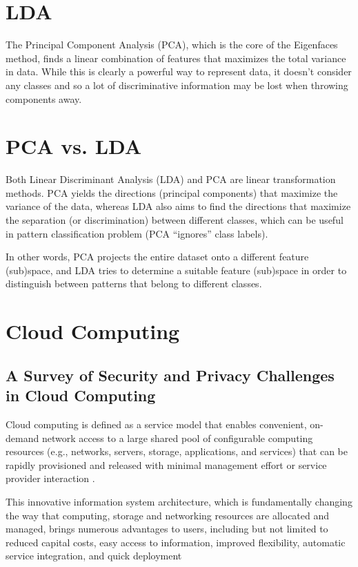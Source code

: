 \documentclass[a4paper]{article}
\begin{document}
\section{LDA}
The Principal Component Analysis (PCA), which is the core of the Eigenfaces method, finds a linear combination of features that maximizes the total variance in data. While this is clearly a powerful way to represent data, it doesn’t consider any classes and so a lot of discriminative information may be lost when throwing components away.

\section{PCA vs. LDA}
Both Linear Discriminant Analysis (LDA) and PCA are linear transformation methods. PCA yields the directions (principal components) that maximize the variance of the data, whereas LDA also aims to find the directions that maximize the separation (or discrimination) between different classes, which can be useful in pattern classification problem (PCA “ignores” class labels). 

In other words, PCA projects the entire dataset onto a different feature (sub)space, and LDA tries to determine a suitable feature (sub)space in order to distinguish between patterns that belong to different classes.

\section{Cloud Computing}
\subsection{A Survey of Security and Privacy Challenges in Cloud Computing}
Cloud computing is defined as a service model that
enables convenient, on-demand network access to a large
shared pool of configurable computing resources (e.g.,
networks, servers, storage, applications, and services)
that can be rapidly provisioned and released with minimal
management effort or service provider interaction \cite{nistcc}.

This innovative information system architecture, which is
fundamentally changing the way that computing, storage
and networking resources are allocated and managed,
brings numerous advantages to users, including but not
limited to reduced capital costs, easy access to information,
improved flexibility, automatic service integration, and quick deployment \cite{ccreally}
\end{document}
